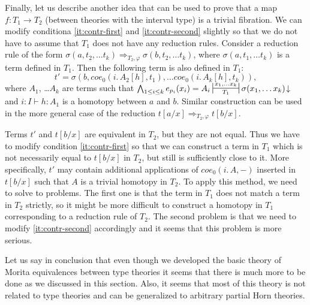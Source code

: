 \documentclass[reqno]{amsart}
\theoremstyle{definition}
\theoremstyle{remark}
\newcommand{\coe}{\mathit{coe}}
\numberwithin{figure}{section}
\begin{document}
Finally, let us describe another idea that can be used to prove that a map $f : T_1 \to T_2$ (between theories with the interval type) is a trivial fibration.
We can modify conditiona \eqref{it:contr-first} and \eqref{it:contr-second} slightly so that we do not have to assume that $T_1$ does not have any reduction rules.
Consider a reduction rule of the form $\sigma(a, t_2, \ldots t_k) \Rightarrow_{T_2,\varphi} \sigma(b, t_2, \ldots t_k)$, where $\sigma(a, t_1, \ldots t_k)$ is a term defined in $T_1$.
Then the following term is also defined in $T_1$:
\[ t' = \sigma(b, \coe_0(i.\,A_2[h],t_1), \ldots \coe_0(i.\,A_k[h],t_k)), \]
where $A_1$, \ldots $A_k$ are terms such that $\bigwedge_{1 \leq i \leq k} e_{p_i}(x_i) = A_i \ssststile{T_1}{x_1, \ldots x_k} \sigma(x_1, \ldots x_k)\!\downarrow$ and $i : I \vdash h : A_1$ is a homotopy between $a$ and $b$.
Similar construction can be used in the more general case of the reduction $t[a/x] \Rightarrow_{T_2,\varphi} t[b/x]$.

Terms $t'$ and $t[b/x]$ are equivalent in $T_2$, but they are not equal.
Thus we have to modify condition \eqref{it:contr-first} so that we can construct a term in $T_1$ which is not necessarily equal to $t[b/x]$ in $T_2$, but still is sufficiently close to it.
More specifically, $t'$ may contain additional applications of $\coe_0(i.\,A,-)$ inserted in $t[b/x]$ such that $A$ is a trivial homotopy in $T_2$.
To apply this method, we need to solve to problems.
The first one is that the term in $T_1$ does not match a term in $T_2$ strictly, so it might be more difficult to construct a homotopy in $T_1$ corresponding to a reduction rule of $T_2$.
The second problem is that we need to modify \eqref{it:contr-second} accordingly and it seems that this problem is more serious.

Let us say in conclusion that even though we developed the basic theory of Morita equivalences between type theories it seems that there is much more to be done as we discussed in this section.
Also, it seems that most of this theory is not related to type theories and can be generalized to arbitrary partial Horn theories.



\end{document}

